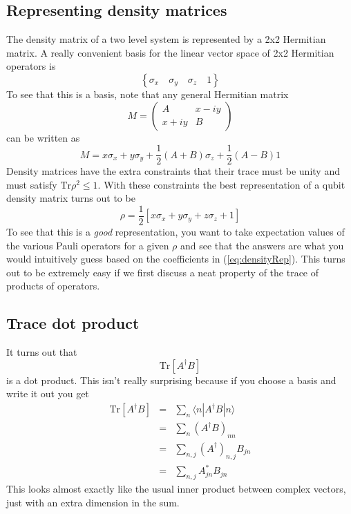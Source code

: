 \documentclass[twocolumn,english,aps,prl]{revtex4}
\newcommand{\braket}[2]{\langle #1|#2\rangle}
\begin{document}
\subsection{Representing density matrices}
The density matrix of a two level system is represented by a 2x2 Hermitian matrix. A really convenient basis for the linear vector space of 2x2 Hermitian operators is \begin{equation}
\left\{  \sigma_x \quad \sigma_y \quad \sigma_z \quad 1 \right\} \label{eq:basis} \end{equation}
To see that this is a basis, note that any general Hermitian matrix \begin{displaymath}
M = \left( \begin{array}{cc} A & x-iy \\ x+iy & B \end{array} \right) \end{displaymath}
can be written as \begin{equation}
M = x\sigma_x + y\sigma_y + \frac{1}{2}(A+B)\sigma_z + \frac{1}{2}(A-B)1 \end{equation}
Density matrices have the extra constraints that their trace must be unity and must satisfy $\textrm{Tr}\rho^2 \le 1$. With these constraints the best representation of a qubit density matrix turns out to be \begin{equation}
\rho = \frac{1}{2} \left[ x\sigma_x + y\sigma_y + z\sigma_z + 1 \right] \label{eq:densityRep} \end{equation}
To see that this is a \emph{good} representation, you want to take expectation values of the various Pauli operators for a given $\rho$ and see that the answers are what you would intuitively guess based on the coefficients in (\ref{eq:densityRep}). This turns out to be extremely easy if we first discuss a neat property of the trace of products of operators.

\subsection{Trace dot product}

It turns out that \begin{equation}
\textrm{Tr} \left[ A^{\dagger}B \right] \end{equation}
is a dot product. This isn't really surprising because if you choose a basis and write it out you get \begin{eqnarray}
\textrm{Tr} \left[ A^{\dagger} B \right] &=& \sum_n \braket{n}{A^{\dagger}B|n} \\ 
&=& \sum_n (A^{\dagger}B)_{nn} \\
&=& \sum_{n,j} (A^{\dagger})_{n,j}B_{jn} \\
&=& \sum_{n,j} A_{jn}^* B_{jn} \end{eqnarray}
This looks almost exactly like the usual inner product between complex vectors, just with an extra dimension in the sum.
\end{document}
